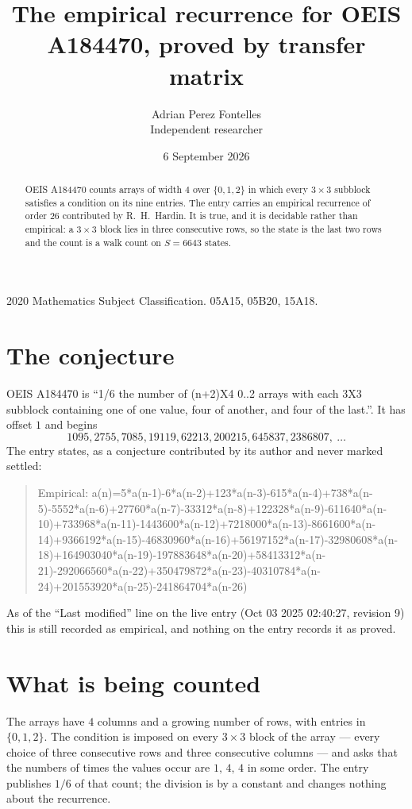 \documentclass[11pt,a4paper]{article}
\title{The empirical recurrence for OEIS A184470, proved by transfer matrix}
\author{Adrian Perez Fontelles\\ \small Independent researcher}
\date{6 September 2026}
\theoremstyle{plain}
\theoremstyle{definition}
\begin{document}
\maketitle

\begin{abstract}
OEIS A184470 counts arrays of width $4$ over $\{0,1,2\}$ in which every $3\times3$ subblock
satisfies a condition on its nine entries. The entry carries an empirical recurrence of order
$26$ contributed by R.~H.~Hardin. It is true, and it is decidable rather than empirical: a
$3\times3$ block lies in three consecutive rows, so the state is the last two rows and the
count is a walk count on $S=6643$ states.
\end{abstract}

\noindent\small 2020 Mathematics Subject Classification. 05A15, 05B20, 15A18.\normalsize

\section{The conjecture}

OEIS A184470 is ``1/6 the number of (n+2)X4 0..2 arrays with each 3X3 subblock containing one of one value, four of another, and four of the last.''. It has offset $1$ and begins
\[
1095, 2755, 7085, 19119, 62213, 200215, 645837, 2386807,\ \dots
\]
The entry states, as a conjecture contributed by its author and never marked settled:
\begin{quote}
Empirical: a(n)=5*a(n-1)-6*a(n-2)+123*a(n-3)-615*a(n-4)+738*a(n-5)-5552*a(n-6)+27760*a(n-7)-33312*a(n-8)+122328*a(n-9)-611640*a(n-10)+733968*a(n-11)-1443600*a(n-12)+7218000*a(n-13)-8661600*a(n-14)+9366192*a(n-15)-46830960*a(n-16)+56197152*a(n-17)-32980608*a(n-18)+164903040*a(n-19)-197883648*a(n-20)+58413312*a(n-21)-292066560*a(n-22)+350479872*a(n-23)-40310784*a(n-24)+201553920*a(n-25)-241864704*a(n-26)
\end{quote}
As of the ``Last modified'' line on the live entry (Oct 03 2025 02:40:27, revision 9) this is still
recorded as empirical, and nothing on the entry records it as proved.

\section{What is being counted}

The arrays have $4$ columns and a growing number of rows, with entries in $\{0,1,2\}$. The
condition is imposed on every $3\times3$ block of the array --- every choice of three
consecutive rows and three consecutive columns --- and asks that the numbers of times the values occur are $1,\,4,\,4$ in some order. The entry publishes $1/6$ of that count; the division is by a constant and changes nothing about the recurrence.
\end{document}
